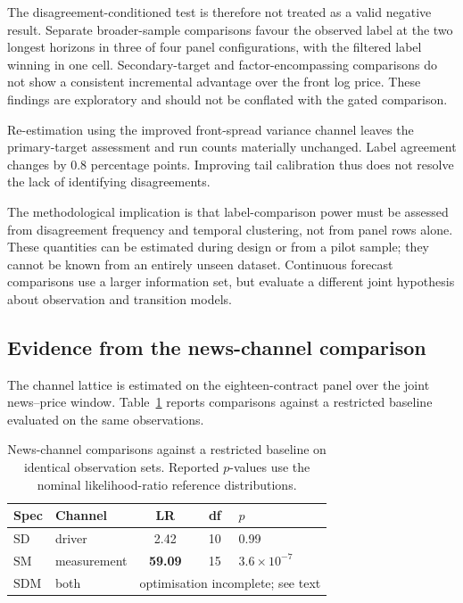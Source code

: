 \documentclass[journal]{IEEEtran}
\begin{document}
The disagreement-conditioned test is therefore not treated as a valid negative result. Separate broader-sample comparisons favour the observed label at the two longest horizons in three of four panel configurations, with the filtered label winning in one cell. Secondary-target and factor-encompassing comparisons do not show a consistent incremental advantage over the front log price. These findings are exploratory and should not be conflated with the gated comparison.

Re-estimation using the improved front-spread variance channel leaves the primary-target assessment and run counts materially unchanged. Label agreement changes by 0.8 percentage points. Improving tail calibration thus does not resolve the lack of identifying disagreements.

The methodological implication is that label-comparison power must be assessed from disagreement frequency and temporal clustering, not from panel rows alone. These quantities can be estimated during design or from a pilot sample; they cannot be known from an entirely unseen dataset. Continuous forecast comparisons use a larger information set, but evaluate a different joint hypothesis about observation and transition models.

\subsection{Evidence from the news-channel comparison}
\label{sec:newsresult}

The channel lattice is estimated on the eighteen-contract panel over the joint news--price window. Table~\ref{tab:latticefit} reports comparisons against a restricted baseline evaluated on the same observations.
\begin{table}[H]
\centering
\caption{News-channel comparisons against a restricted baseline on identical observation sets. Reported $p$-values use the nominal likelihood-ratio reference distributions.}
\label{tab:latticefit}
\small
\setlength{\tabcolsep}{5pt}
\renewcommand{\arraystretch}{1.2}
\begin{tabular}{@{}llccl@{}}
\toprule
\textbf{Spec} & \textbf{Channel} & \textbf{LR} & \textbf{df} & \textbf{$p$} \\
\midrule
$\mathrm{SD}$  & driver      & 2.42  & 10 & 0.99 \\
$\mathrm{SM}$  & measurement & \textbf{59.09} & 15 & $3.6\times10^{-7}$ \\
$\mathrm{SDM}$ & both        & \multicolumn{3}{l}{optimisation incomplete; see text} \\
\bottomrule
\end{tabular}
\end{table}
\end{document}
